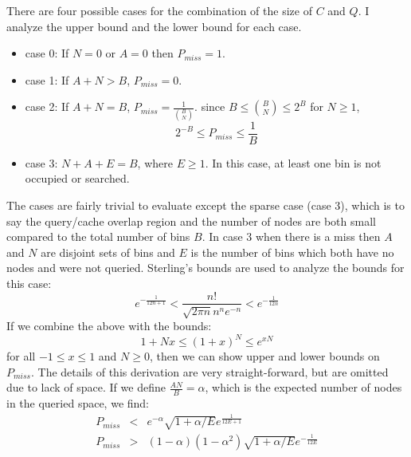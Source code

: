 \documentclass[9.5pt,journal,final,finalsubmission,twocolumn]{IEEEtran}
\begin{document}
There are four possible cases for the combination of the size of $C$ and $Q$. 
I analyze the upper bound and the lower bound for each case. 
\begin{itemize}
\item case 0: If $N=0$ or $A=0$ then $P_{miss}=1$.
\item case 1: If $A+N>B$, $P_{miss}=0$.
\item case 2: If $A+N=B$, $P_{miss}=\frac{1}{{{B}\choose{N}}}$. 
since $B \leq {{B}\choose{N}} \leq 2^{B}$ for $N\geq 1$,  
\begin{equation}
2^{-B} \leq P_{miss} \leq \frac{1}{B}
\end{equation}
\item case 3: $N+A+E=B$, where $E\geq1$. In this case, at least one bin is not 
occupied or searched.
\end{itemize}

The cases are fairly trivial to evaluate except the sparse case (case 3),
which is to say the query/cache overlap region and the number
of nodes are both small compared to the total number of bins $B$.
In case 3 when there is a miss then $A$ and $N$ are disjoint sets of bins and
$E$ is the number of bins which both have no nodes and were not queried.
Sterling's bounds are used to analyze the bounds for this case:
\begin{equation}
\label{eq:sterling}
e^{-\frac{1}{12n+1}} < \frac{n!}{\sqrt{2\pi n}n^n e^{-n}} < e^{-\frac{1}{12n}}
\end{equation}
If we combine the above with the bounds:
\begin{equation*}
1 + Nx \le (1+x)^N \le e^{xN}
\end{equation*}
for all $-1 \le x \le 1$ and $N\ge 0$, then we can show upper and lower bounds on $P_{miss}$.
The details of this derivation are very straight-forward, but are omitted due to
lack of space.  If we define $\frac{AN}{B} = \alpha$, which is the expected number
of nodes in the queried space, we find:
\begin{eqnarray*}
P_{miss} &<& e^{-\alpha} \sqrt{1+\alpha/E} e^{\frac{1}{12E + 1}}\\
P_{miss} &>& (1-\alpha)(1-\alpha^2) \sqrt{1+\alpha/E} e^{-\frac{1}{12E}}
\end{eqnarray*}
\end{document}
